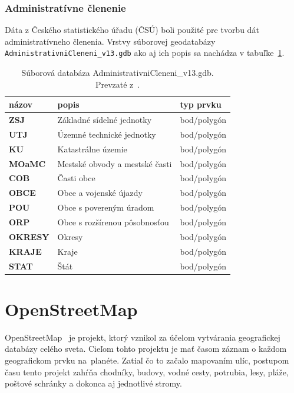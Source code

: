 \subsubsection*{Administratívne členenie}
Dáta z Českého statistického úřadu (ČSÚ) boli použité pre tvorbu dát administratívneho členenia. Vrstvy súborovej geodatabázy \texttt{AdministrativniCleneni\_v13.gdb} ako aj ich popis sa nachádza v tabuľke~\ref{tab:administrativne-clenenie}.
\begin{table}[H]
\caption{Súborová databáza AdministrativniCleneni\_v13.gdb. Prevzaté z~\cite{arcgis}.}
\label{tab:administrativne-clenenie}
\centering
\begin{tabular}{|lll|}
    \hline
    \textbf{názov}  & \textbf{popis}                 & \textbf{typ prvku} \\ \hline
    \textbf{ZSJ}    & Základné sídelné jednotky      & bod/polygón        \\
    \textbf{UTJ}    & Územné technické jednotky      & bod/polygón        \\
    \textbf{KU}     & Katastrálne územie             & bod/polygón        \\
    \textbf{MOaMC}  & Mestské obvody a mestské časti & bod/polygón        \\
    \textbf{COB}    & Časti obce                     & bod/polygón        \\
    \textbf{OBCE}   & Obce a vojenské újazdy         & bod/polygón        \\
    \textbf{POU}    & Obce s povereným úradom        & bod/polygón        \\
    \textbf{ORP}    & Obce s rozšírenou pôsobnosťou  & bod/polygón        \\
    \textbf{OKRESY} & Okresy                         & bod/polygón        \\
    \textbf{KRAJE}  & Kraje                          & bod/polygón        \\
    \textbf{STAT}   & Štát                           & bod/polygón        \\ \hline
\end{tabular}
\end{table}


\section{OpenStreetMap}
OpenStreetMap~\cite{openstreet} je projekt, ktorý vznikol za účelom vytvárania geografickej databázy celého sveta. Cieľom tohto projektu je mať časom záznam o každom geografickom prvku na~planéte. Zatiaľ čo to začalo mapovaním ulíc, postupom času tento projekt zahŕňa chodníky, budovy, vodné cesty, potrubia, lesy, pláže, poštové schránky a dokonca aj jednotlivé stromy.


